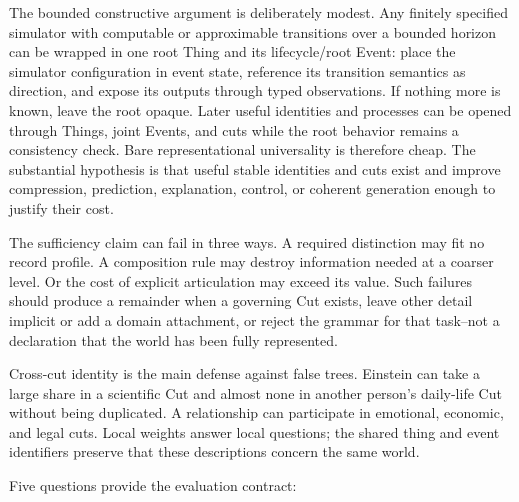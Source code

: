 \documentclass[11pt,a4paper]{article}
\begin{document}
The bounded constructive argument is deliberately modest. Any finitely
specified simulator with computable or approximable transitions over a bounded
horizon can be wrapped in one root Thing and its lifecycle/root Event: place the
simulator configuration in event state, reference its transition semantics as
direction, and expose its outputs through typed observations. If nothing more
is known, leave the root opaque. Later useful identities and processes can be
opened through Things, joint Events, and cuts while the root behavior remains a
consistency check. Bare representational universality is therefore cheap. The
substantial hypothesis is that useful stable identities and cuts exist and
improve compression, prediction, explanation, control, or coherent generation
enough to justify their cost.

The sufficiency claim can fail in three ways. A required distinction may fit no
record profile. A composition rule may destroy information needed at a coarser
level. Or the cost of explicit articulation may exceed its value. Such failures
should produce a remainder when a governing Cut exists, leave other detail
implicit or add a domain attachment, or reject the grammar for that task--not
a declaration that the world has been fully represented.

Cross-cut identity is the main defense against false trees. Einstein can take
a large share in a scientific Cut and almost none in another person's daily-life
Cut without being duplicated. A relationship can participate in emotional,
economic, and legal cuts. Local weights answer local questions; the shared
thing and event identifiers preserve that these descriptions concern the same
world.

Five questions provide the evaluation contract:
\end{document}
